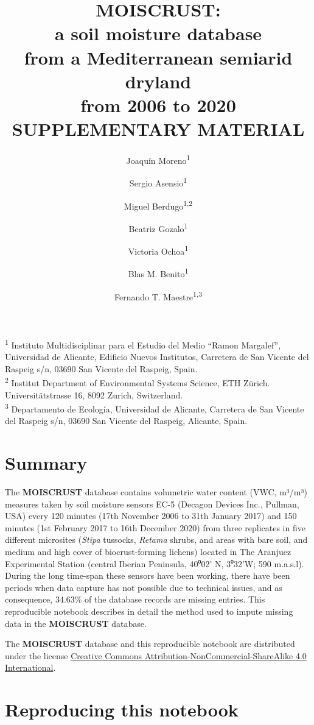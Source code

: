 \documentclass[
  table]{article}
\title{MOISCRUST:\\
a soil moisture database\\
from a Mediterranean semiarid dryland\\
from 2006 to 2020\\
SUPPLEMENTARY MATERIAL}
\author{Joaquín Moreno\textsuperscript{1} \and Sergio Asensio\textsuperscript{1} \and Miguel Berdugo\textsuperscript{1,2} \and Beatriz Gozalo\textsuperscript{1} \and Victoria Ochoa\textsuperscript{1} \and Blas M. Benito\textsuperscript{1} \and Fernando T. Maestre\textsuperscript{1,3}}
\date{}
\begin{document}
\maketitle

\renewcommand*\contentsname{Table of contents}
{
\hypersetup{linkcolor=}
\setcounter{tocdepth}{1}
\tableofcontents
}
\textsuperscript{1} Instituto Multidisciplinar para el Estudio del Medio
``Ramon Margalef'', Universidad de Alicante, Edificio Nuevos Institutos,
Carretera de San Vicente del Raspeig s/n, 03690 San Vicente del Raspeig,
Spain.\\
\textsuperscript{2} Institut Department of Environmental Systems
Science, ETH Zürich. Universitätstrasse 16, 8092 Zurich, Switzerland.\\
\textsuperscript{3} Departamento de Ecología, Universidad de Alicante,
Carretera de San Vicente del Raspeig s/n, 03690 San Vicente del Raspeig,
Alicante, Spain.

\newpage

\hypertarget{summary}{%
\section{Summary}\label{summary}}

The \textbf{MOISCRUST} database contains volumetric water content (VWC,
m³/m³) measures taken by soil moisture sensors EC-5 (Decagon Devices
Inc., Pullman, USA) every 120 minutes (17th November 2006 to 31th
January 2017) and 150 minutes (1st February 2017 to 16th December 2020)
from three replicates in five different microsites (\emph{Stipa}
tussocks, \emph{Retama} shrubs, and areas with bare soil, and medium and
high cover of biocrust-forming lichens) located in The Aranjuez
Experimental Station (central Iberian Peninsula, 40⁰02' N, 3⁰32'W; 590
m.a.s.l). During the long time-span these sensors have been working,
there have been periods when data capture has not possible due to
technical issues, and as consequence, 34.63\% of the database records
are missing entries. This reproducible notebook describes in detail the
method used to impute missing data in the \textbf{MOISCRUST} database.

The \textbf{MOISCRUST} database and this reproducible notebook are
distributed under the license
\href{https://creativecommons.org/licenses/by/4.0/legalcode}{Creative
Commons Attribution-NonCommercial-ShareAlike 4.0 International}.

\hypertarget{reproducing-this-notebook}{%
\section{Reproducing this notebook}\label{reproducing-this-notebook}}
\end{document}
